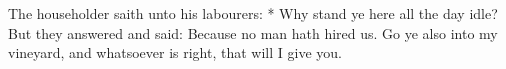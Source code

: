 The householder saith unto his labourers: * Why stand ye here all the day idle? But they answered and said: Because no man hath hired us. Go ye also into my vineyard, and whatsoever is right, that will I give you.